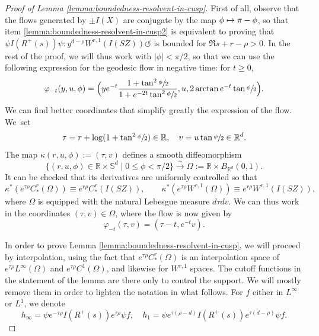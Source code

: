 \documentclass[10pt]{amsart}
\newcommand\mto{\mathchoice{\longmapsto}{\mapsto}{\mapsto}{\mapsto}}
\newcommand{\R}{\mathbb{R}}
\newcommand{\Ss}{\mathbb{S}}
\newcommand{\ZZ}{I(SZ)}
\theoremstyle{plain}
\theoremstyle{definition}
\begin{document}
\begin{proof}[Proof of Lemma \ref{lemma:boundedness-resolvent-in-cusp}]
First of all, observe that the flows generated by $\pm I(X)$ are conjugate by the map $\phi \mto \pi-\phi$, so that item \eqref{lemma:boundedness-resolvent-in-cusp2} is equivalent to proving that $\psi I(R^+(s)) \psi : y^{d-\rho} W^{r,1}(\ZZ) \circlearrowleft$ is bounded for $\Re s + r - \rho >0$. In the rest of the proof, we will thus work with $|\phi| < \pi/2$, so that we can use the following expression for the geodesic flow in negative time: for $t \geq 0$,
\begin{equation}
\label{equation:flot}
\varphi_{-t}(y,u,\phi) = \Bigl( y e^{-t} \frac{1+\tan^2\sfrac{\phi}{2}}{1+ e^{-2t} \tan^2\sfrac{\phi}{2}} ,u,2 \arctan e^{-t} \tan \sfrac{\phi}{2} \Bigr).
\end{equation}
We can find better coordinates that simplify greatly the expression of the flow. We~set
\[
\tau = r + \log(1+\tan^2\sfrac{\phi}{2})\in \R,\quad v = u \tan\sfrac{\phi}{2}\in \R^d.
\]
The map $\kappa(r,u,\phi):=(\tau,v)$ defines a smooth diffeomorphism
\[
\{(r,u,\phi)\in \R \times\Ss^d \mid 0 \leq \phi<\pi/2\}\stackrel\sim\to\Omega := \R\times B_{\R^d}(0, 1).
\]
It can be checked that its derivatives are uniformly controlled so that
\[
\kappa^\ast ( e^{\tau \rho} C^r_\ast(\Omega) ) \equiv e^{r\rho} C^r_\ast(\ZZ),\qquad \kappa^\ast ( e^{\tau \rho} W^{r,1}(\Omega)) \equiv e^{r \rho} W^{r,1}(\ZZ),
\]
where $\Omega$ is equipped with the natural Lebesgue measure $d\tau dv$.
We can thus work in the coordinates $(\tau,v)\in\Omega$, where the flow is now given by
\begin{equation}
\label{equation:flotbis}
\varphi_{-t}(\tau,v) = (\tau - t, e^{-t} v).
\end{equation}

In order to prove Lemma \ref{lemma:boundedness-resolvent-in-cusp}, we will proceed by interpolation, using the fact that $e^{\tau \rho} C^r_\ast(\Omega)$ is an interpolation space of $e^{\tau \rho} L^\infty(\Omega)$ and $e^{\tau\rho} C^1(\Omega)$, and likewise for $W^{r,1}$ spaces. The cutoff functions in the statement of the lemma are there only to control the support. We will mostly remove them in order to lighten the notation in what follows. For $f$ either in $L^\infty$ or $L^1$, we denote
\[
h_\infty = \psi e^{-\tau \rho} I(R^+(s)) e^{\tau \rho} \psi f,\quad h_1 = \psi e^{\tau (\rho-d)} I(R^+(s)) e^{\tau(d-\rho)} \psi f.
\]


\end{proof}
\end{document}
